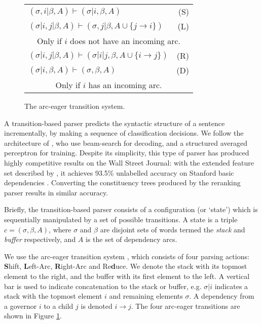 \documentclass[11pt,letterpaper]{article}
\begin{document}
\begin{figure}
    \centering
    \begin{tabular}{lr}
        $(\sigma,i | \beta, A) \vdash (\sigma | i, \beta, A) $ \hfill & \hfill (S) \\
        $(\sigma | i,j | \beta, A) \vdash ( \sigma, j | \beta, A \cup \{ j \rightarrow i \} ) $ \hfill & \hfill (L) \\
        \multicolumn{2}{c}{Only if $i$ does not have an incoming arc.}\\
        $(\sigma | i,j | \beta, A) \vdash ( \sigma | i | j, \beta, A \cup \{ i \rightarrow j \} ) $ \hfill & \hfill (R) \\
        $(\sigma | i, \beta, A) \vdash ( \sigma, \beta, A )$ \hfill & \hfill  (D) \\
        \multicolumn{2}{c}{Only if $i$ has an incoming arc.}\\


    \end{tabular}
    \caption{\small The arc-eager transition system.\label{fig:ae_notation}}
\end{figure}


A transition-based parser predicts the syntactic structure of a sentence incrementally,
by making a sequence of classification decisions.  We follow the architecture of
\citet{zhang:cl11}, who use beam-search for decoding, and a structured averaged
perceptron for training.  Despite its simplicity, this type of parser
has produced highly competitive results on the Wall Street Journal: with the
extended feature set described by \citet{zhang:11}, it achieves 93.5\%
unlabelled accuracy on Stanford basic dependencies \citep{stanford_deps}.  Converting
the constituency trees produced by the \citet{Charniak05a} reranking parser
results in similar accuracy.

Briefly, the transition-based parser consists of a configuration (or `state') which
is sequentially manipulated by a set of possible transitions.  A state is a triple
$c = (\sigma, \beta, A)$, where $\sigma$ and $\beta$ are disjoint sets of words
termed the \emph{stack} and \emph{buffer} respectively, and $A$ is the set of
dependency arcs.

We use the arc-eager transition system \citep{nivre:03,nivre:cl}, which consists
of four parsing actions:  \textbf{S}hift, \textbf{L}eft-Arc,
\textbf{R}ight-Arc and Re\textbf{d}uce.
We denote the stack with its topmost element
to the right, and the buffer with its first element to the left. A vertical bar
is used to indicate concatenation to the stack or buffer, e.g. $\sigma | i$ indicates
a stack with the topmost element $i$ and remaining elements $\sigma$.  
A dependency from a governor $i$ to a child $j$ is denoted $i \rightarrow j$.
The four arc-eager transitions are shown in Figure \ref{fig:ae_notation}.
\end{document}

